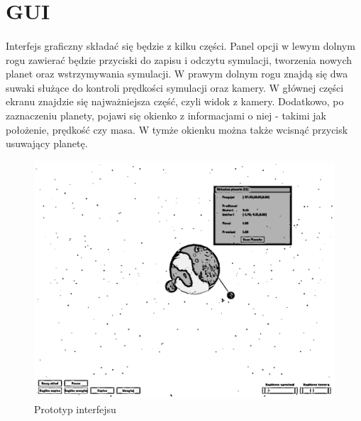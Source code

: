\section{GUI}\label{sec:gui}

\paragraph{}

Interfejs graficzny składać się będzie z kilku części. Panel opcji w lewym dolnym rogu zawierać będzie przyciski do zapisu i odczytu symulacji, tworzenia nowych planet oraz wstrzymywania symulacji. W prawym dolnym rogu znajdą się dwa suwaki służące do kontroli prędkości symulacji oraz kamery. W głównej części ekranu znajdzie się najważniejsza część, czyli widok z kamery. Dodatkowo, po zaznaczeniu planety, pojawi się okienko z informacjami o niej - takimi jak położenie, prędkość czy masa. W tymże okienku można także wcisnąć przycisk usuwający planetę.

\begin{figure}[h]
	\centering
	\includegraphics[width=1.0\textwidth]{gui.png}
	\caption{Prototyp interfejsu}
	\label{fig:gui}
\end{figure}

